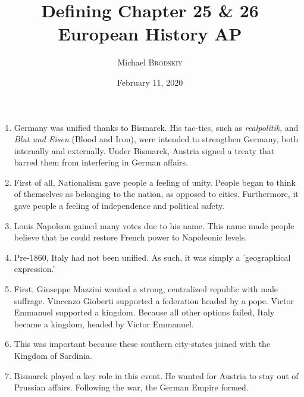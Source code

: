 \documentclass[12pt]{article}
\newcommand{\subtitle}[1]{%
  \posttitle{%
    \par\end{center}
    \begin{center}\large#1\end{center}
    \vskip0.5em}%
}
\begin{document}


\author{Michael \textsc{Brodskiy}}
\title{Defining Chapter 25 \& 26 \\European History AP}
\subtitle{Mrs Fisher}
\date{February 11, 2020}
\maketitle



\begin{enumerate}

\item Germany was unified thanks to Bismarck. His tac-tics, such as \textit{realpolitik}, and \textit{Blut und Eisen} (Blood and Iron), were intended to strengthen Germany, both internally and externally. Under Bismarck, Austria signed a treaty that barred them from interfering in German affairs.

\item First of all, Nationalism gave people a feeling of unity. People began to think of themselves as belonging to the nation, as opposed to cities. Furthermore, it gave people a feeling of independence and political safety.

\item Louis Napoleon gained many votes due to his name. This name made people believe that he could restore French power to Napoleonic levels.

\item Pre-1860, Italy had not been unified. As such, it was simply a 'geographical expression.'

\item First, Giuseppe Mazzini wanted a strong, centralized republic with male suffrage. Vincenzo Gioberti supported a federation headed by a pope. Victor Emmanuel supported a kingdom. Because all other options failed, Italy became a kingdom, headed by Victor Emmanuel.  

\item This was important because these southern city-states joined with the Kingdom of Sardinia.

\item Bismarck played a key role in this event. He wanted for Austria to stay out of Prussian affairs. Following the war, the German Empire formed.


\end{enumerate}
\end{document}
